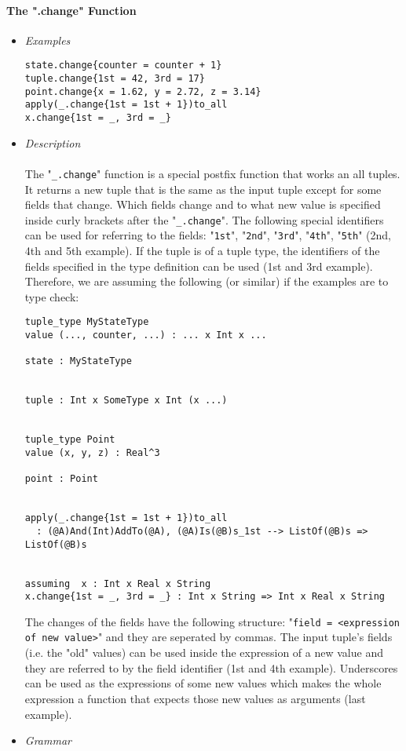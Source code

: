 \documentclass{article}
\begin{document}
\paragraph{The ".change" Function}

\begin{itemize}

\item \textit{Examples}

\begin{verbatim}
state.change{counter = counter + 1} 
tuple.change{1st = 42, 3rd = 17}
point.change{x = 1.62, y = 2.72, z = 3.14}
apply(_.change{1st = 1st + 1})to_all
x.change{1st = _, 3rd = _}
\end{verbatim}

\item \textit{Description}
\\\\
The "\verb|_.change|" function is a special postfix function that works an all
tuples. It returns a new tuple that is the same as the input tuple except for
some fields that change. Which fields change and to what new value is specified
inside curly brackets after the "\verb|_.change|". The following special
identifiers can be used for referring to the fields:
"\verb|1st|", "\verb|2nd|", "\verb|3rd|", "\verb|4th|", "\verb|5th|"
(2nd, 4th and 5th example). If the tuple is of a tuple type, the identifiers of
the fields specified in the type definition can be used (1st and 3rd example).
Therefore, we are assuming the following (or similar) if the examples are to
type check:

\begin{verbatim}
tuple_type MyStateType
value (..., counter, ...) : ... x Int x ...

state : MyStateType


tuple : Int x SomeType x Int (x ...)


tuple_type Point
value (x, y, z) : Real^3

point : Point


apply(_.change{1st = 1st + 1})to_all
  : (@A)And(Int)AddTo(@A), (@A)Is(@B)s_1st --> ListOf(@B)s => ListOf(@B)s


assuming  x : Int x Real x String
x.change{1st = _, 3rd = _} : Int x String => Int x Real x String
\end{verbatim}
The changes of the fields have the following structure:
"\verb|field = <expression of new value>|"
and they are seperated by commas. The input tuple's fields (i.e. the
"old" values) can be used inside the expression of a new value and they are
referred to by the field identifier (1st and 4th example). Underscores can be 
used as the expressions of some new values which makes the whole expression 
a function that expects those new values as arguments (last example).
\item \textit{Grammar}


\end{itemize}
\end{document}
